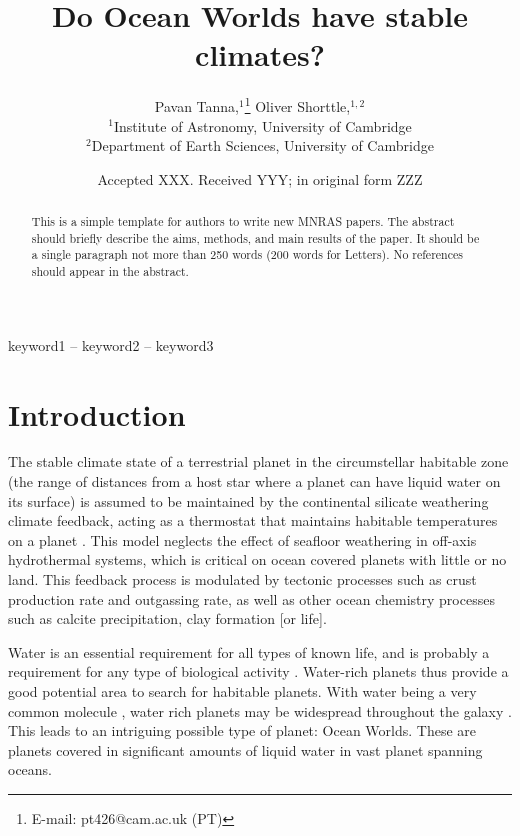 \documentclass[fleqn,usenatbib]{mnras}
\title[Short title, max. 45 characters]{Do Ocean Worlds have stable climates?}
\author[P. Tanna et al.]{
Pavan Tanna,$^{1}$\thanks{E-mail: pt426@cam.ac.uk (PT)}
Oliver Shorttle,$^{1,2}$
\\
$^{1}$Institute of Astronomy, University of Cambridge\\
$^{2}$Department of Earth Sciences, University of Cambridge
}
\date{Accepted XXX. Received YYY; in original form ZZZ}
\begin{document}
\label{firstpage}
\pagerange{\pageref{firstpage}--\pageref{lastpage}}
\maketitle

\begin{abstract}
This is a simple template for authors to write new MNRAS papers.
The abstract should briefly describe the aims, methods, and main results of the paper.
It should be a single paragraph not more than 250 words (200 words for Letters).
No references should appear in the abstract.
\end{abstract}

\begin{keywords}
keyword1 -- keyword2 -- keyword3
\end{keywords}



\section{Introduction}

The stable climate state of a terrestrial planet in the circumstellar habitable zone (the range of distances from a host star where a planet can have liquid water on its surface) is assumed to be maintained by the continental silicate weathering climate feedback, acting as a thermostat that maintains habitable temperatures on a planet \citep{walker_negative_1981, kasting_habitable_1993, kopparapu_habitable_2013}. This model neglects the effect of seafloor weathering in off-axis hydrothermal systems, which is critical on ocean covered planets with little or no land. This feedback process is modulated by tectonic processes such as crust production rate and outgassing rate, as well as other ocean chemistry processes such as calcite precipitation, clay formation [or life].


Water is an essential requirement for all types of known life, and is probably a requirement for any type of biological activity \citep{keller_exploration_2025}. Water-rich planets thus provide a good potential area to search for habitable planets. With water being a very common molecule \citep{noack_water_2017}, water rich planets may be widespread throughout the galaxy \citep{lichtenberg_water_2019}. This leads to an intriguing possible type of planet: Ocean Worlds. These are planets covered in significant amounts of liquid water in vast planet spanning oceans.
\end{document}
